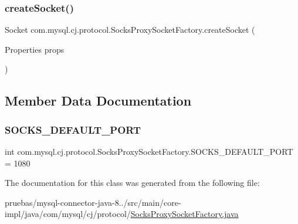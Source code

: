 \subsubsection{\texorpdfstring{create\+Socket()}{createSocket()}}
{\footnotesize\ttfamily Socket com.\+mysql.\+cj.\+protocol.\+Socks\+Proxy\+Socket\+Factory.\+create\+Socket (\begin{DoxyParamCaption}\item[{Properties}]{props }\end{DoxyParamCaption})\hspace{0.3cm}{\ttfamily [protected]}}



\subsection{Member Data Documentation}
\mbox{\label{classcom_1_1mysql_1_1cj_1_1protocol_1_1_socks_proxy_socket_factory_af27432a7b73a88cdf4238cfdd9e4eec2}} 
\subsubsection{\texorpdfstring{S\+O\+C\+K\+S\+\_\+\+D\+E\+F\+A\+U\+L\+T\+\_\+\+P\+O\+RT}{SOCKS\_DEFAULT\_PORT}}
{\footnotesize\ttfamily int com.\+mysql.\+cj.\+protocol.\+Socks\+Proxy\+Socket\+Factory.\+S\+O\+C\+K\+S\+\_\+\+D\+E\+F\+A\+U\+L\+T\+\_\+\+P\+O\+RT = 1080\hspace{0.3cm}{\ttfamily [static]}}



The documentation for this class was generated from the following file\+:\begin{DoxyCompactItemize}
\item 
pruebas/mysql-\/connector-\/java-\/8../src/main/core-\/impl/java/com/mysql/cj/protocol/\mbox{\hyperlink{_socks_proxy_socket_factory_8java}{Socks\+Proxy\+Socket\+Factory.\+java}}\end{DoxyCompactItemize}

